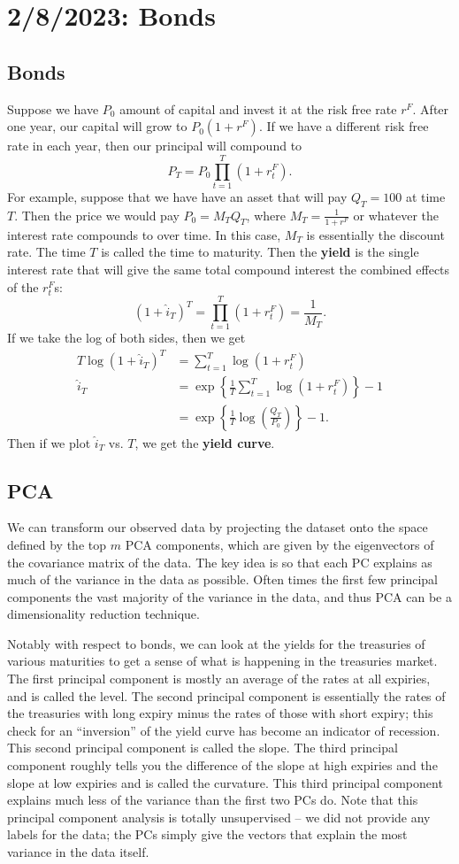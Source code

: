 \chapter{2/8/2023: Bonds}
\section{Bonds}
Suppose we have $P_0$ amount of capital and invest it at the risk free rate $r^F$. After one year, our capital will grow to $P_0(1+r^F)$. If we have a different risk free rate in each year, then our principal will compound to $$ P_T = P_0\prod_{t=1}^T(1+r_t^F). $$ For example, suppose that we have have an asset that will pay $Q_T=100$ at time $T$. Then the price we would pay $P_0=M_TQ_T$, where $M_T=\frac{1}{1+r^F}$ or whatever the interest rate compounds to over time. In this case, $M_T$ is essentially the discount rate. The time $T$ is called the time to maturity. Then the \textbf{yield} is the single interest rate that will give the same total compound interest the combined effects of the $r_t^F$s: $$ (1+\hat i_T)^T = \prod_{t=1}^T(1+r_t^F) = \frac{1}{M_T}. $$ If we take the log of both sides, then we get \begin{align*}
	T\log(1+\hat i_T)^T &= \sum_{t=1}^T\log(1+r_t^F) \\
	\hat i_T &= \exp\left\{\frac{1}{T}\sum_{t=1}^T\log(1+r_t^F)\right\} - 1 \\
		&= \exp\left\{\frac{1}{T}\log\left(\frac{Q_T}{P_0}\right)\right\}-1.
\end{align*} Then if we plot $\hat i_T$ vs. $T$, we get the \textbf{yield curve}.

\section{PCA}
We can transform our observed data by projecting the dataset onto the space defined by the top $m$ PCA components, which are given by the eigenvectors of the covariance matrix of the data. The key idea is so that each PC explains as much of the variance in the data as possible. Often times the first few principal components the vast majority of the variance in the data, and thus PCA can be a dimensionality reduction technique.

Notably with respect to bonds, we can look at the yields for the treasuries of various maturities to get a sense of what is happening in the treasuries market. The first principal component is mostly an average of the rates at all expiries, and is called the level. The second principal component is essentially the rates of the treasuries with long expiry minus the rates of those with short expiry; this check for an ``inversion'' of the yield curve has become an indicator of recession. This second principal component is called the slope. The third principal component roughly tells you the difference of the slope at high expiries and the slope at low expiries and is called the curvature. This third principal component explains much less of the variance than the first two PCs do. Note that this principal component analysis is totally unsupervised -- we did not provide any labels for the data; the PCs simply give the vectors that explain the most variance in the data itself.

